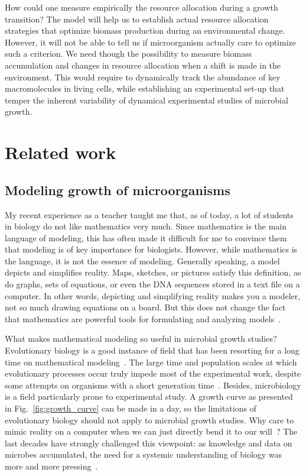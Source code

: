 How could one measure empirically the resource allocation during a growth transition?
The model will help us to establish actual resource allocation strategies that optimize biomass production during an environmental change.
However, it will not be able to tell us if microorganism actually care to optimize such a criterion.
We need though the possibility to measure biomass accumulation and changes in resource allocation when a shift is made in the environment.
This would require to dynamically track the abundance of key macromolecules in living cells, while establishing an experimental set-up that temper the inherent variability of dynamical experimental studies of microbial growth.

\section{Related work}

\subsection{Modeling growth of microorganisms}

My recent experience as a teacher taught me that, as of today, a lot of students in biology do not like mathematics very much.
Since mathematics is the main language of modeling, this has often made it difficult for me to convince them that modeling is of key importance for biologists.
However, while mathematics is the language, it is not the essence of modeling.
Generally speaking, a model depicts and simplifies reality.
Maps, sketches, or pictures satisfy this definition, as do graphs, sets of equations, or even the DNA sequences stored in a text file on a computer.
In other words, depicting and simplifying reality makes you a modeler, not so much drawing equations on a board.
But this does not change the fact that mathematics are powerful tools for formulating and analyzing models~\cite{servedio_not_2014,mcgill_calm_2013}.

What makes mathematical modeling so useful in microbial growth studies?
Evolutionary biology is a good instance of field that has been resorting for a long time on mathematical modeling~\cite{servedio_not_2014}.
The large time and population scales at which evolutionary processes occur truly impede most of the experimental work, despite some attempts on organisms with a short generation time~\cite{elena_evolution_2003}.
Besides, microbiology is a field particularly prone to experimental study.
A growth curve as presented in Fig.~\ref{fig:growth_curve} can be made in a day, so the limitations of evolutionary biology should not apply to microbial growth studies.
Why care to mimic reality on a computer when we can just directly bend it to our will~\cite{hillis_why_1993}?
The last decades have strongly challenged this viewpoint: as knowledge and data on microbes accumulated, the need for a systemic understanding of biology was more and more pressing~\cite{alon_introduction_2006,kremling_systems_2013}.

